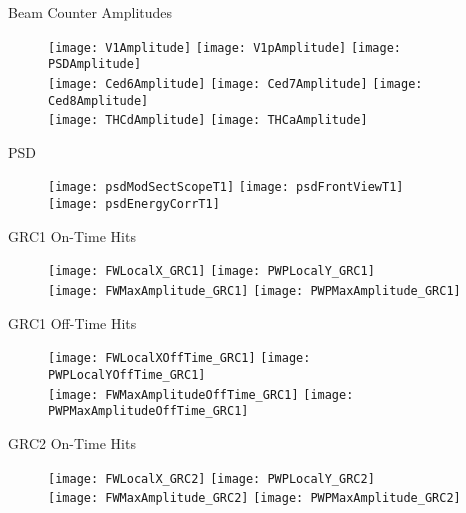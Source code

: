 \documentclass[11pt]{beamer}
\begin{document}
\begin{frame}{Beam Counter Amplitudes}
\begin{figure}
\centering
\texttt{[image: V1Amplitude]} 
\texttt{[image: V1pAmplitude]}
\texttt{[image: PSDAmplitude]} \\
\texttt{[image: Ced6Amplitude]}
\texttt{[image: Ced7Amplitude]} 
\texttt{[image: Ced8Amplitude]} \\
\texttt{[image: THCdAmplitude]} 
\texttt{[image: THCaAmplitude]} 
\end{figure}
\end{frame}

\begin{frame}{PSD}
\begin{figure}
\centering
\texttt{[image: psdModSectScopeT1]}
\texttt{[image: psdFrontViewT1]} \\
\texttt{[image: psdEnergyCorrT1]}
\end{figure}
\end{frame}

\begin{frame}{GRC1 On-Time Hits}
\begin{figure}
\centering
\texttt{[image: FWLocalX\_GRC1]}
\texttt{[image: PWPLocalY\_GRC1]} \\
\texttt{[image: FWMaxAmplitude\_GRC1]}
\texttt{[image: PWPMaxAmplitude\_GRC1]} 
\end{figure}
\end{frame}

\begin{frame}{GRC1 Off-Time Hits}
\begin{figure}
\centering
\texttt{[image: FWLocalXOffTime\_GRC1]}
\texttt{[image: PWPLocalYOffTime\_GRC1]} \\
\texttt{[image: FWMaxAmplitudeOffTime\_GRC1]}
\texttt{[image: PWPMaxAmplitudeOffTime\_GRC1]} 
\end{figure}
\end{frame}

\begin{frame}{GRC2 On-Time Hits}
\begin{figure}
\centering
\texttt{[image: FWLocalX\_GRC2]}
\texttt{[image: PWPLocalY\_GRC2]} \\
\texttt{[image: FWMaxAmplitude\_GRC2]}
\texttt{[image: PWPMaxAmplitude\_GRC2]} 
\end{figure}
\end{frame}
\end{document}
